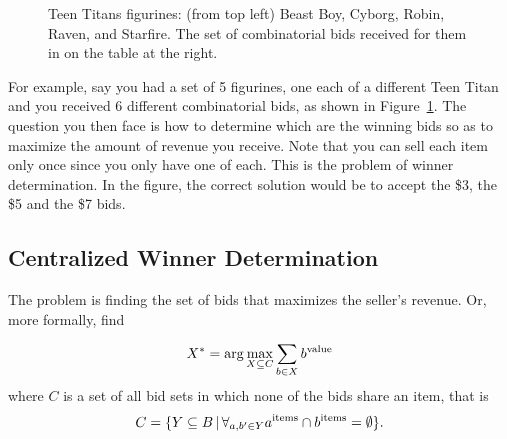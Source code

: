 \begin{figure}
  \begin{minipage}{1.0\linewidth}
    \begin{center}
    \end{center}
  \end{minipage}
  \caption{Teen Titans figurines: (from top left) Beast
    Boy, Cyborg, Robin, Raven, and Starfire. The set of
    combinatorial bids received for them in on the table at the
    right.}
  \label{fig:titans}
\end{figure}

For example, say you had a set of 5 figurines, one each of a different
Teen Titan and you received 6 different combinatorial bids, as shown
in Figure~\ref{fig:titans}.  The question you then face is how to
determine which are the winning bids so as to maximize the amount of
revenue you receive. Note that you can sell each item only once since
you only have one of each. This is the problem of winner
determination. In the figure, the correct solution would be to accept
the \$3, the \$5 and the \$7 bids.


\subsection{Centralized Winner Determination}

The  problem is finding the set of bids that
maximizes the seller's revenue. Or, more formally, find

\begin{equation}
  \label{eq:wdp}
  X^* = \arg \max_{X \subseteq C} \sum_{b \in X} b^{\text{value}}{}
\end{equation}
where $C$ is a set of all bid sets in which none of the bids share an
item, that is
\begin{equation}
  \label{eq:complete}
  C = \{Y \subseteq B \,|\, \forall_{a,b' \in Y} a^{\text{items}} \cap b^{\text{items}} = \emptyset\}.
\end{equation}

